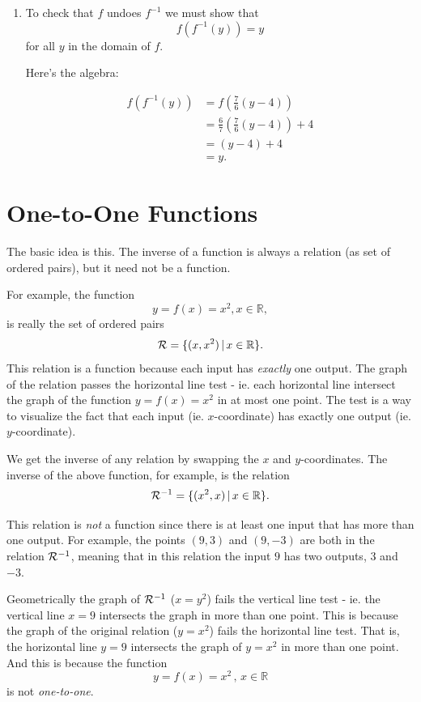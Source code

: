 \documentclass{ximera}
\begin{document}
\begin{question}
\begin{explanation}
\begin{enumerate}
\item To check that $f$ undoes $f^{-1}$ we must show that
\[
     f(f^{-1}(y)) = y
\]
for all $y$ in the domain of $f$.

Here's the algebra:

\begin{align*}
     f(f^{-1}(y)) &= f\left(   \frac{7}{6} \left( y - 4\right)\right) \\ 
                       &= \frac{6}{7} \left( \frac{7}{6} \left( y - 4\right) \right) +4  \\
                       &= (y-4) + 4 \\
                       &= y.
\end{align*}


\end{enumerate}
\end{explanation}
\end{question}

\section{One-to-One Functions}

The basic idea is this. The inverse of a function is always a relation (as set of ordered pairs), but it need not be a function.

For example, the function 
\[
   y=f(x) = x^2 , x\in \mathbb{R},
\]
is really the set of ordered pairs
\[
  {\cal R} = \{  (x,x^2) \, | \, x \in \mathbb{R} \}. 
\]
This relation is a function because each input has \emph{exactly} one output. The graph of the relation passes the horizontal line test - ie. each horizontal line intersect the graph of the function $y=f(x)=x^2$ in at most one point. The test is a way to visualize the fact that each input (ie. $x$-coordinate) has exactly one output (ie. $y$-coordinate).

We get the inverse of any relation by swapping the $x$ and $y$-coordinates. The inverse of the above function, for example, is the relation
\[
  {\cal R}^{-1}  = \{  (x^2, x)  \, | \, x \in \mathbb{R}\}.
\] 

This relation is \emph{not} a function since there is at least one input that has more than one output. For example, the points $(9,3)$ and $(9,-3)$ are both in the relation ${\cal R}^{-1}$, meaning that in this relation the input $9$ has two outputs, $3$ and $-3$.

Geometrically the graph of ${\cal R}^{-1}$ ($x=y^2$) fails the vertical line test - ie. the vertical line $x=9$ intersects the graph in more than one point. This is because the graph of the original relation ($y=x^2$) fails the horizontal line test. That is, the horizontal line $y=9$ intersects the graph of $y=x^2$ in more than one point. And this is because the function
\[
 y = f(x) = x^2 \, , \, x\in \mathbb{R}
\]
is not \emph{one-to-one}. 
\end{document}
